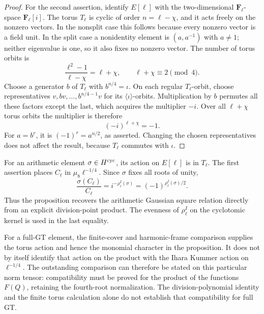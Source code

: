 \begin{proof}
For the second assertion, identify \(E[\ell]\) with the
two-dimensional \(\mathbf F_\ell\)-space \(\mathbf F_\ell[i]\).
The torus \(T_\ell\) is cyclic of order \(n=\ell-\chi\),
and it acts freely on the nonzero vectors. In the nonsplit
case this follows because every nonzero vector is a field unit.
In the split case a nonidentity element is
\((a,a^{-1})\) with \(a\ne1\); neither eigenvalue is one,
so it also fixes no nonzero vector. The number of torus orbits
is
\[
                \frac{\ell^2-1}{\ell-\chi}=\ell+\chi,
                                      \qquad \ell+\chi\equiv2\pmod4.
\]
Choose a generator \(b\) of \(T_\ell\) with \(b^{n/4}=\iota\).
On each regular \(T_\ell\)-orbit, choose representatives
\(v,bv,\ldots,b^{n/4-1}v\) for its \(\langle\iota\rangle\)-orbits.
Multiplication by \(b\) permutes all these factors except the
last, which acquires the multiplier \(-i\).
Over all \(\ell+\chi\) torus orbits the multiplier is therefore
\[
                       (-i)^{\ell+\chi}=-1.
\]
For \(a=b^r\), it is \((-1)^r=a^{n/2}\), as asserted.
Changing the chosen representatives does not affect the result,
because \(T_\ell\) commutes with \(\iota\).
\end{proof}

For an arithmetic element \(\sigma\in H^{\rm cyc}\), its action
on \(E[\ell]\) is in \(T_\ell\).
The first assertion places \(C_\ell\) in
\(\mu_8\ell^{-1/4}\). Since \(\sigma\) fixes all roots of unity,
\[
        \frac{\sigma(C_\ell)}{C_\ell}
                =i^{-\rho_\ell^I(\sigma)}
                =(-1)^{\rho_\ell^I(\sigma)/2}.
\]
Thus the proposition recovers the arithmetic Gaussian square
relation directly from an explicit division-point product.
The evenness of \(\rho_\ell^I\) on the cyclotomic kernel is
used in the last equality.

For a full-GT element, the finite-cover and harmonic-frame
comparison supplies the torus action and hence the monomial
character in the proposition. It does not by itself identify
that action on the product with the Ihara Kummer action on
\(\ell^{-1/4}\). The outstanding comparison can therefore be
stated on this particular norm tensor: compatibility must be
proved for the product of the functions \(F(Q)\), retaining
the fourth-root normalization. The division-polynomial identity
and the finite torus calculation alone do not establish that
compatibility for full GT.
